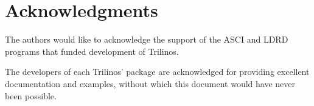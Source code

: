 \documentclass[12pt,relax]{SANDreport}
\begin{document}
\clearpage
\section*{Acknowledgments}
The authors would like to acknowledge the support of the ASCI and LDRD programs
that funded development of Trilinos.

\medskip

The developers of each Trilinos' package are acknowledged for providing
excellent documentation and examples, without which this document would
have never been possible.


\clearpage

\SANDmain

\tableofcontents

\clearpage



%

\clearpage
\newpage


\clearpage
\newpage


\clearpage
\newpage


\clearpage
\newpage


\clearpage
\newpage


\clearpage
\newpage


\clearpage
\newpage


\clearpage
\newpage


\clearpage
\newpage


%

\clearpage
\newpage




\end{document}
